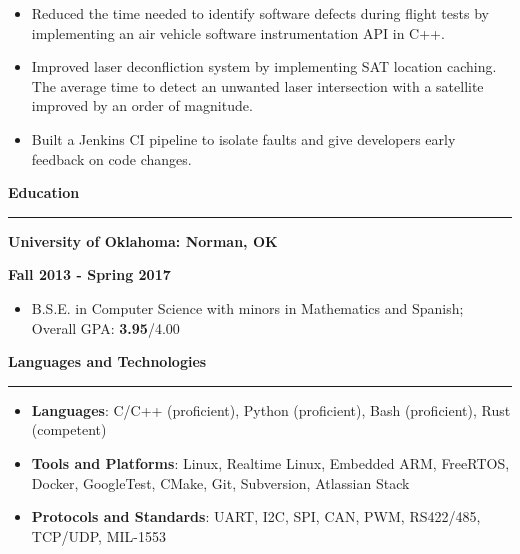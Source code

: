 \documentclass[11pt,letterpaper]{article}
\begin{document}
\begin{itemize}[noitemsep,topsep=0pt]
	\setlength\itemsep{0.2em}
	\item Reduced the time needed to identify software defects during flight
	      tests by implementing an air vehicle software instrumentation API in
	      C++.
	\item Improved laser deconfliction system by implementing SAT location
	      caching. The average time to detect an unwanted laser intersection
	      with a satellite improved by an order of magnitude.
	\item Built a Jenkins CI pipeline to isolate faults and give developers
	      early feedback on code changes.
\end{itemize}

\medskip

\begin{large}
	\textbf{Education}
\end{large}

\smallskip \hrule \medskip

\begin{minipage}[t]{0.5\textwidth}
	\begin{flushleft}
		\textbf{University of Oklahoma: Norman, OK}\\

	\end{flushleft}
\end{minipage}
\begin{minipage}[t]{0.46\textwidth}
	\begin{flushright}
		\textbf{Fall 2013 - Spring 2017}

	\end{flushright}
\end{minipage}
\begin{itemize}[topsep=0pt]
	\setlength\itemsep{0.2em}
	\item B.S.E. in Computer Science with minors in Mathematics and Spanish;
	      Overall GPA: \textbf{3.95}/{4.00}
\end{itemize}

\medskip

\begin{large}
	\textbf{Languages and Technologies}
\end{large}

\smallskip \hrule \medskip

\begin{itemize}[topsep=0pt]
	\setlength\itemsep{0.2em}
	\item \textbf{Languages}: C/C++ (proficient),
	      Python (proficient),
	      Bash (proficient),
	      Rust (competent)
	\item \textbf{Tools and Platforms}: Linux,
	      Realtime Linux,
	      Embedded ARM,
	      FreeRTOS,
	      Docker,
	      GoogleTest,
	      CMake,
	      Git,
	      Subversion,
	      Atlassian Stack
	\item \textbf{Protocols and Standards}: 
        UART,
	      I2C,
	      SPI,
	      CAN,
	      PWM,
	      RS422/485,
	      TCP/UDP,
	      MIL-1553
\end{itemize}
\end{document}
